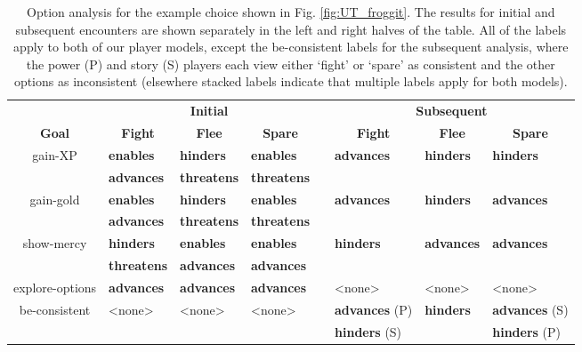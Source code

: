 \documentclass[arts,article,submit,moreauthors,pdftex,10pt,a4paper]{Definitions/mdpi}
\newcommand{\enables}{\textbf{\color{enables}enables}}
\newcommand{\advances}{\textbf{\color{advances}advances}}
\newcommand{\threatens}{\textbf{\color{threatens}threatens}}
\newcommand{\hinders}{\textbf{\color{hinders}hinders}}
\begin{document}
\begin{table}[H]
\centering
\begin{tabular}{c l l l c l l l}
  \toprule
  & \multicolumn{3}{c}{\textbf{Initial}} && \multicolumn{3}{c}{\textbf{Subsequent}} \\
  \cmidrule(r){1-1} \cmidrule{2-4} \cmidrule{6-8}
  \textbf{Goal} & \multicolumn{1}{c}{\textbf{Fight}} & \multicolumn{1}{c}{\textbf{Flee}} & \multicolumn{1}{c}{\textbf{Spare}} && \multicolumn{1}{c}{\textbf{Fight}} & \multicolumn{1}{c}{\textbf{Flee}} & \multicolumn{1}{c}{\textbf{Spare}} \\
  \cmidrule(r){1-1} \cmidrule{2-4} \cmidrule{6-8}
  \multirow{2}{7em}{\centering gain-XP} & \enables{} & \hinders{} & \enables{} && \multirow{2}{4.5em}{\advances{}} & \multirow{2}{4.5em}{\hinders{}} & \multirow{2}{4.5em}{\hinders{}} \\
                                        & \advances{} & \threatens{} & \threatens{} && & & \\
  \cmidrule(r){1-1} \cmidrule{2-4} \cmidrule{6-8}
  \multirow{2}{7em}{\centering gain-gold} & \enables{} & \hinders{} & \enables{} && \multirow{2}{4.5em}{\advances{}} & \multirow{2}{4.5em}{\hinders{}} & \multirow{2}{4.5em}{\advances{}} \\
                                          & \advances{} & \threatens{} & \threatens{} && & & \\
  \cmidrule(r){1-1} \cmidrule{2-4} \cmidrule{6-8}
  \multirow{2}{7em}{\centering show-mercy} & \hinders{} & \enables{} & \enables{} && \multirow{2}{4.5em}{\hinders{}} & \multirow{2}{4.5em}{\advances{}} & \multirow{2}{4.5em}{\advances{}} \\
                                          & \threatens{} & \advances{} & \advances{} \\
  \cmidrule(r){1-1} \cmidrule{2-4} \cmidrule{6-8}
  explore-options & \advances{} & \advances{} & \advances{} && <none> & <none> & <none> \\
  \cmidrule(r){1-1} \cmidrule{2-4} \cmidrule{6-8}
  \multirow{2}{7em}{\centering be-consistent} & \multirow{2}{4.5em}{<none>} & \multirow{2}{4.5em}{<none>} & \multirow{2}{4.5em}{<none>} && \advances{} (P) & \multirow{2}{4.5em}{\hinders{}} & \advances{} (S) \\
  & & & && \hinders{} (S) & & \hinders{} (P) \\
  \bottomrule
\end{tabular}
  \caption[\emph{Undertale}option analysis]{Option analysis for the example choice shown in Fig. \ref{fig:UT_froggit}. The results for initial and subsequent encounters are shown separately in the left and right halves of the table. All of the labels apply to both of our player models, except the be-consistent labels for the subsequent analysis, where the power (P) and story (S) players each view either `fight' or `spare' as consistent and the other options as inconsistent (elsewhere stacked labels indicate that multiple labels apply for both models).}
\label{tab:UT_options}
\end{table}
\end{document}
